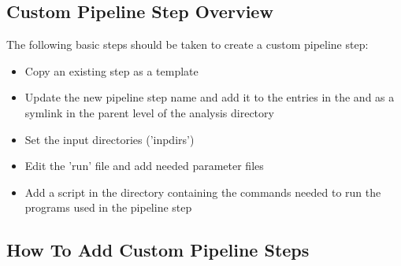 \subsection[Overview]{Custom Pipeline Step Overview}\label{custom-pipeline-steps-overview}%
The following basic steps should be taken to create a custom pipeline step:
\begin{itemize}
\item Copy an existing step as a template
\item Update the new pipeline step name and add it to the entries in the  and as a symlink in the parent level of the analysis directory
\item Set the input directories ('inpdirs')
\item Edit the 'run' file and add needed parameter files
\item Add a script in the  directory containing the commands needed to run the programs used in the pipeline step
\end{itemize}
%
\subsection[How To Add Steps]{How To Add Custom Pipeline Steps}\label{how-to-add-custom-pipeline-steps}%

